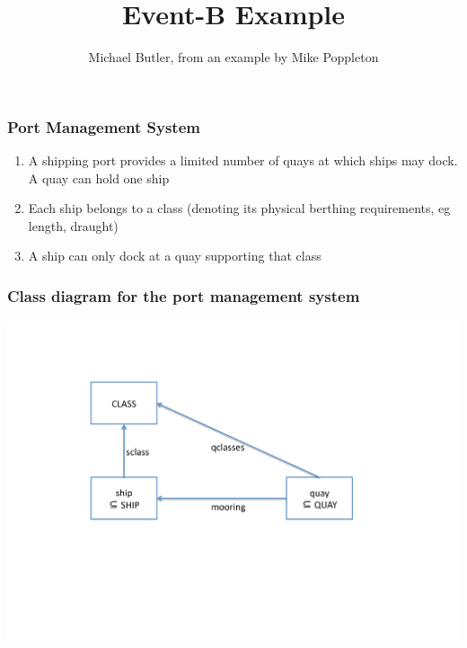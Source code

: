 \documentclass{beamer}
\title{Event-B Example}
\author{Michael Butler, from an example by Mike Poppleton}
\institute{ University of Southampton }
\begin{document}
\begin{frame}

\titlepage

\end{frame}






\begin{frame}

\frametitle{Port Management System}

\begin{enumerate}

\item A shipping port provides a limited number of \alert{quays} at which \alert{ships} may \alert{dock}.  A quay can hold one ship \\[2ex]

\item Each ship belongs to a \alert{class} (denoting its physical berthing requirements, eg length, draught) \\[2ex]

\item A ship can only dock at a quay supporting that class 



\end{enumerate}



\end{frame}











\begin{frame} \frametitle{Class diagram for the port management  system}

  \begin{center}
    \includegraphics[scale=.5]{ship1.pdf}
  \end{center}

\end{frame}
\end{document}

